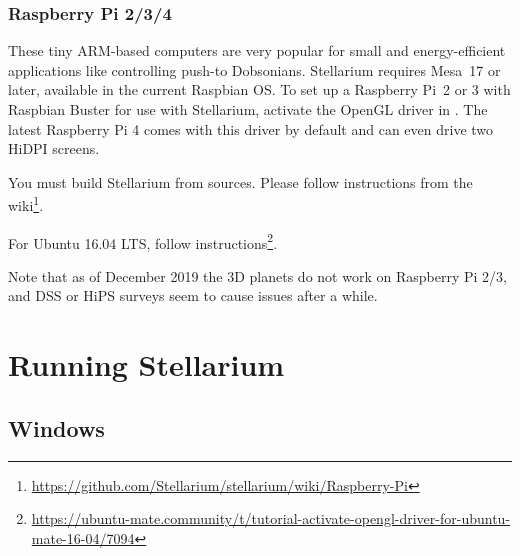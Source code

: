 \subsubsection{Raspberry Pi 2/3/4}
These tiny ARM-based computers are very popular for small and energy-efficient applications like controlling push-to Dobsonians. 
Stellarium requires Mesa~17 or later, available in the current Raspbian OS. 
To set up a Raspberry Pi~2 or 3 with Raspbian Buster for use with Stellarium, activate the OpenGL driver in 
. The latest Raspberry Pi 4 comes with this driver by default and can even drive two HiDPI screens.

You must build Stellarium from sources. Please follow instructions from the wiki\footnote{\url{https://github.com/Stellarium/stellarium/wiki/Raspberry-Pi}}.

For Ubuntu 16.04 LTS, follow instructions\footnote{\url{https://ubuntu-mate.community/t/tutorial-activate-opengl-driver-for-ubuntu-mate-16-04/7094}}. 
	
Note that as of December 2019 the 3D planets do not work on Raspberry Pi 2/3, and DSS or HiPS surveys seem to cause issues after a while.
	

\section{Running Stellarium}
\label{sec:GettingStarted:Running}

\subsection{Windows}
\label{sec:GettingStarted:Running:Windows}

